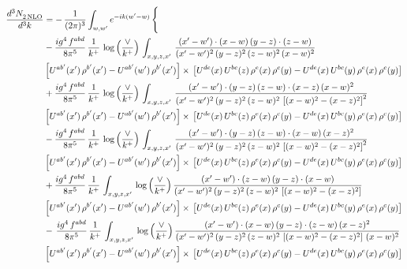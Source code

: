 \documentclass[9pt]{article}
\numberwithin{equation}{section}
\begin{document}
\begin{align}
   \frac{d^{3}N_{2\,\rm NLO}^{\rm}}{d^{3}k}  & =  -\,\frac{1}{(2\pi)^{3}}  \int_{w, w^\prime} e^{-ik(w^\prime-w)}\, \Bigg\{\notag \\
& -\frac{ig^{4}\, f^{abd}}{8\pi^{5}}\, \frac{1}{k^{+}}\, \log{\left(\frac{\vee}{k^{+}}\right)}\,\int_{x,y,z,x'}\,\frac{(x'-w')\cdot (x-w)\, (y-z)\cdot (z-w)}{(x'-w')^{2}\, (y-z)^{2}\, (z-w)^{2}\,(x-w)^{2}}\, \notag \\ & \left[U^{ab'}(x')\,\rho^{b'}(x')-U^{ab'}(w')\, \rho^{b'}(x')\right]\times\,\left[U^{de}(x)\,U^{bc}(z)\, \rho^{e}(x)\,\rho^{c}(y)-U^{de}(x)\,U^{bc}(y)\,\rho^{e}(x)\,\rho^{c}(y)\right] \notag \\
&  + \frac{ig^{4}\, f^{abd}}{8\pi^{5}}\, \frac{1}{k^{+}}\,\log{\left(\frac{\vee}{k^{+}}\right)}\, \int_{x,y,z,x'}\,\frac{(x'-w')\cdot  (y-z)\, (z-w)\cdot (x-z)\, (x-w)^{2}}{(x'-w')^{2}\, (y-z)^{2}\, (z-w)^{2}\,\left[(x-w)^{2}-(x-z)^{2}\right]^{2}}\, \notag \\ & \left[U^{ab'}(x')\,\rho^{b'}(x')-U^{ab'}(w')\, \rho^{b'}(x')\right]\times\,\left[U^{de}(x)\,U^{bc}(z)\, \rho^{e}(x)\,\rho^{c}(y)-U^{de}(x)\,U^{bc}(y)\,\rho^{e}(x)\,\rho^{c}(y)\right] \notag \\
&   - \frac{ig^{4}\, f^{abd}}{8\pi^{5}}\, \frac{1}{k^{+}}\,\log{\left(\frac{\vee}{k^{+}}\right)}\, \int_{x,y,z,x'}\,\frac{(x'-w')\cdot  (y-z)\, (z-w)\cdot (x-w)\, (x-z)^{2}}{(x'-w')^{2}\, (y-z)^{2}\, (z-w)^{2}\,\left[(x-w)^{2}-(x-z)^{2}\right]^{2}}\, \notag \\ & \left[U^{ab'}(x')\,\rho^{b'}(x')-U^{ab'}(w')\, \rho^{b'}(x')\right]\times\,\left[U^{de}(x)\,U^{bc}(z)\, \rho^{e}(x)\,\rho^{c}(y)-U^{de}(x)\,U^{bc}(y)\,\rho^{e}(x)\,\rho^{c}(y)\right] \notag \\
&  + \frac{ig^{4}\, f^{abd}}{8\pi^{5}}\, \frac{1}{k^{+}}\, \int_{x,y,z,x'}\,\log{\left(\frac{\vee}{k^{+}}\right)}\,\frac{(x'-w')\cdot (z-w)\, (y-z)\cdot (x-w)}{(x'-w')^{2}\, (y-z)^{2}\, (z-w)^{2}\,\left[(x-w)^{2}-(x-z)^{2}\right]}\, \notag \\ & \left[U^{ab'}(x')\,\rho^{b'}(x')-U^{ab'}(w')\, \rho^{b'}(x')\right]\times\,\left[U^{de}(x)\,U^{bc}(z)\, \rho^{e}(x)\,\rho^{c}(y)-U^{de}(x)\,U^{bc}(y)\,\rho^{e}(x)\,\rho^{c}(y)\right] \notag \\
& -\,\frac{ig^{4}\, f^{abd}}{8\pi^{5}}\, \frac{1}{k^{+}}\, \int_{x,y,z,x'}\,\log{\left(\frac{\vee}{k^{+}}\right)}\,\frac{(x'-w')\cdot (x-w)\, (y-z)\cdot(z-w)\,(x-z)^{2}}{(x'-w')^{2}\, (y-z)^{2}\, (z-w)^{2}\,\left[(x-w)^{2}-(x-z)^{2}\right]\,(x-w)^{2}}\, \notag \\ & \left[U^{ab'}(x')\,\rho^{b'}(x')-U^{ab'}(w')\, \rho^{b'}(x')\right]\times\,\left[U^{de}(x)\,U^{bc}(z)\, \rho^{e}(x)\,\rho^{c}(y)-U^{de}(x)\,U^{bc}(y)\,\rho^{e}(x)\,\rho^{c}(y)\right] \notag \\

\end{align}
\end{document}
